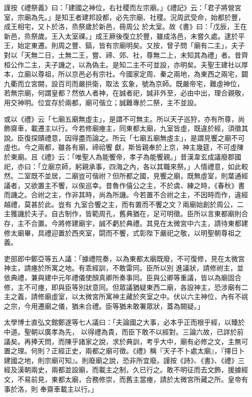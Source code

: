 \begin{pinyinscope}
 謹按《禮祭義》曰：「建國之神位，右社稷而左宗廟。」《禮記》云：「君子將營宮室，宗廟為先。」是知王者建邦設都，必先宗廟、社稷。況周武受命，始都於豐，成王相宅，又卜於洛，烝祭歲於新邑，冊周公
 於太室。故《書》曰：「戊辰，王在新邑，烝祭歲。王入太室祼。」成王厥後復立於豐，雖成洛邑，未嘗久處。逮於平王，始定東遷。則周之豐、鎬，皆有宗廟明矣。又按，曾子問「廟有二主」，夫子對以「天無二日，土無二王，嘗、禘、郊、社，尊無二上，未知其為禮」者。昔齊桓公作二主，夫子譏之，以為偽主。是知二主不可並設，亦明矣。夫聖王建社以厚本，立廟以尊祖，所以京邑必有宗社。今國家定周、秦之兩地，為東西之兩宅，闢九衢而立宮闕，設百司而嚴拱衛，取法
 玄象，號為京師。既嚴帝宅，難虛神位，若無宗廟，何謂皇都？然依人者神，在誠者祀，誠非外至，必由中出，理合親敬，用交神明。位宜存於兩都，廟可偕立；誠難專於二祭，主不並設。



 或以《禮》云「七廟五廟無虛主」，是謂不可無主。所以天子巡狩，亦有所尊，尚飾齋車，載遷主以行。今若修廟瘞主，同東都太廟，九室皆虛，既違於經，須徵其說。臣復探賾禮意，因得盡而論之。所云「七廟五廟無虛主」，是謂見饗之廟不可虛也。今之兩都，雖各有廟，禘祫饗
 獻，斯皆親奉於上京，神主幾筵，不可虛陳於東廟。且《禮》云：「唯聖人為能饗帝，孝子為能饗親。」昔漢韋玄成議廢郡國祀，亦曰：「立廟京師，躬親承事，四海之內，各以其職來祭。」人情禮意，如此較然。二室既不並居，二廟豈可偕祔？但所都之國，見饗之廟，既無虛室，則葉通經議者，又欲置主不饗，以俟巡幸。昔魯作僖公之主，不於虞、練之時，《春秋》書而譏之。合祔之主，作非其時，尚為所譏。今若置不合祔之主，不因時而作，違經越禮，莫甚於此。豈有
 九室合饗之主，而有置而不饗之文？兩廟始創於周公，二主獲譏於夫子。自古制作，皆範周孔，舊典猶在，足可明徵。臣所以言東都廟則合存，主不合置。今將修建廟宇，誠不虧於典禮。其見在太微宮中六主，請待東都建修太廟畢，具禮迎置於西夾室，閟而不饗，式彰陛下嚴祀之敬，以明聖朝尊祖之義。



 吏部郎中鄭亞等五人議：「據禮院奏，以為東都太廟既廢，不可復修，見在太微宮神主，請瘞於所寓之地。有乖經訓，不敢雷同。臣所以別
 進議狀，請修祔主，並依典禮，兼與建中元年禮儀使顏真卿所奏事同。臣與公卿等重議，皆以為廟固合修，主不可瘞，即與臣等別狀意同。但眾議猶疑東西二廟，各設神主，恐涉廟有二主之義，請修廟虛室，以太微宮所寓神主藏於夾室之中。伏以六主神位，內有不祧之宗，今用遷廟之儀，猶未合禮。臣等猶未敢署眾狀，蓋為闕疑。」



 太學博士直弘文館鄭遂等七人議曰：「夫論國之大事，必本乎正而根乎經，以臻於中道。聖朝以廣孝為先，
 以得禮為貴，而臣下敢不以經對。三論六故，已詳於前議矣。再捧天問，而陳乎諸家之說，求於典訓，考乎大中，廟有必修之文，主無可置之理。何則？正經正史，兩都之廟可徵。《禮》稱『天子不卜處太廟』，『擇日卜建國之地，則宗廟可知』。則廢廟之說，恐非所宜廢。謹按《詩》、《書》、《禮》三經及漢朝兩史，兩都並設廟，而載主之制，久已行之。敢不明征而去文飾，援據經文，不易前見，東都太廟，合務修崇，而舊主當瘞，請於太微宮所藏之所。皇帝有事於洛，則
 奉齋車載主以行。」




\end{pinyinscope}
